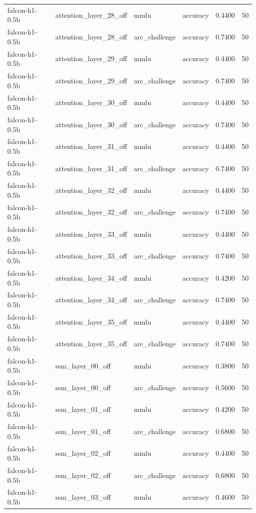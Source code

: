 \begin{tabular}{llllrr}
falcon-h1-0.5b & attention_layer_28_off & mmlu & accuracy & 0.4400 & 50 \\
falcon-h1-0.5b & attention_layer_28_off & arc_challenge & accuracy & 0.7400 & 50 \\
falcon-h1-0.5b & attention_layer_29_off & mmlu & accuracy & 0.4400 & 50 \\
falcon-h1-0.5b & attention_layer_29_off & arc_challenge & accuracy & 0.7400 & 50 \\
falcon-h1-0.5b & attention_layer_30_off & mmlu & accuracy & 0.4400 & 50 \\
falcon-h1-0.5b & attention_layer_30_off & arc_challenge & accuracy & 0.7400 & 50 \\
falcon-h1-0.5b & attention_layer_31_off & mmlu & accuracy & 0.4400 & 50 \\
falcon-h1-0.5b & attention_layer_31_off & arc_challenge & accuracy & 0.7400 & 50 \\
falcon-h1-0.5b & attention_layer_32_off & mmlu & accuracy & 0.4400 & 50 \\
falcon-h1-0.5b & attention_layer_32_off & arc_challenge & accuracy & 0.7400 & 50 \\
falcon-h1-0.5b & attention_layer_33_off & mmlu & accuracy & 0.4400 & 50 \\
falcon-h1-0.5b & attention_layer_33_off & arc_challenge & accuracy & 0.7400 & 50 \\
falcon-h1-0.5b & attention_layer_34_off & mmlu & accuracy & 0.4200 & 50 \\
falcon-h1-0.5b & attention_layer_34_off & arc_challenge & accuracy & 0.7400 & 50 \\
falcon-h1-0.5b & attention_layer_35_off & mmlu & accuracy & 0.4400 & 50 \\
falcon-h1-0.5b & attention_layer_35_off & arc_challenge & accuracy & 0.7400 & 50 \\
falcon-h1-0.5b & ssm_layer_00_off & mmlu & accuracy & 0.3800 & 50 \\
falcon-h1-0.5b & ssm_layer_00_off & arc_challenge & accuracy & 0.5600 & 50 \\
falcon-h1-0.5b & ssm_layer_01_off & mmlu & accuracy & 0.4200 & 50 \\
falcon-h1-0.5b & ssm_layer_01_off & arc_challenge & accuracy & 0.6800 & 50 \\
falcon-h1-0.5b & ssm_layer_02_off & mmlu & accuracy & 0.4400 & 50 \\
falcon-h1-0.5b & ssm_layer_02_off & arc_challenge & accuracy & 0.6800 & 50 \\
falcon-h1-0.5b & ssm_layer_03_off & mmlu & accuracy & 0.4600 & 50 \\

\end{tabular}

